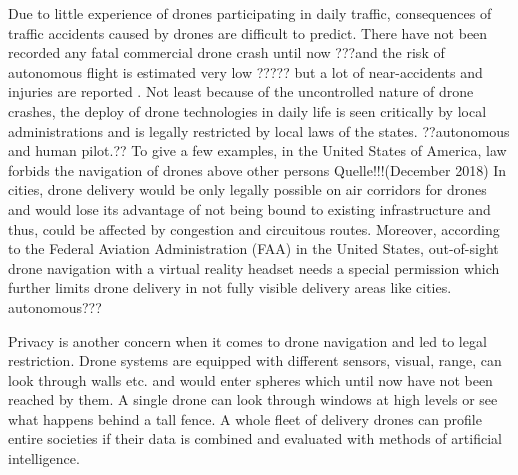 Due to little experience of drones
participating in daily traffic,
consequences of traffic accidents caused
by drones are difficult to predict. 
There have not been recorded any fatal commercial drone crash until now
???and the risk of autonomous flight is estimated very low ?????
but a lot of near-accidents and injuries are reported
.
Not least because of the uncontrolled nature of drone crashes,
the deploy of drone technologies in daily life is seen critically by
local administrations and
is legally restricted by local laws of the states.
??autonomous and human pilot.??
To give a few examples, 
in the United States of America, 
law forbids the navigation of drones above other persons Quelle!!!(December 2018) 
In cities, drone delivery would be only legally possible on air corridors for drones
and would lose its advantage of not being bound to existing infrastructure
and thus, could be affected by congestion and circuitous routes.
Moreover, according to the Federal Aviation Administration (FAA) in the United States,
out-of-sight drone navigation with a virtual reality headset needs a special permission
which further limits drone delivery in not fully visible delivery areas like cities.
autonomous???

Privacy is another concern when it comes to drone navigation
and led to legal restriction.
Drone systems are equipped with different sensors,
visual, range, can look through walls etc.
and would enter spheres which until now have not been
reached by them. A single drone can look through windows at high levels
or see what happens behind a tall fence. A whole fleet of
delivery drones can profile entire societies if their data
is combined and evaluated with methods of artificial intelligence.

